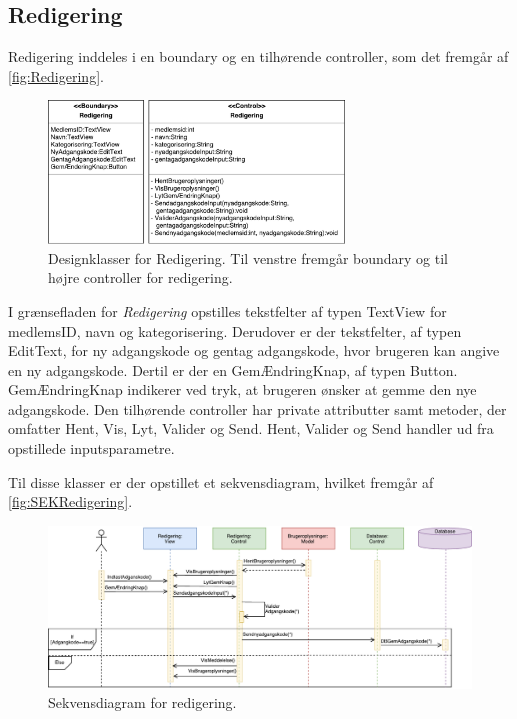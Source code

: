 \subsection*{Redigering}
Redigering inddeles i en boundary og en tilhørende controller, som det fremgår af \autoref{fig:Redigering}. 

\begin{figure} [H]
\centering
\includegraphics[width=0.7\textwidth]{figures/MVC/Redigering}
\caption{Designklasser for Redigering. Til venstre fremgår boundary og til højre controller for redigering.}
\label{fig:Redigering}
\end{figure}

\noindent
I grænsefladen for \textit{Redigering} opstilles tekstfelter af typen TextView for medlemsID, navn og kategorisering. Derudover er der tekstfelter, af typen EditText, for ny adgangskode og gentag adgangskode, hvor brugeren kan angive en ny adgangskode. Dertil er der en GemÆndringKnap, af typen Button. GemÆndringKnap indikerer ved tryk, at brugeren ønsker at gemme den nye adgangskode. 
Den tilhørende controller har private attributter samt metoder, der omfatter Hent, Vis, Lyt, Valider og Send. Hent, Valider og Send handler ud fra opstillede inputsparametre. 


Til disse klasser er der opstillet et sekvensdiagram, hvilket fremgår af \autoref{fig:SEKRedigering}.


\begin{figure} [H]
\centering
\includegraphics[width=1\textwidth]{figures/Sek/SEKRedigering}
\caption{Sekvensdiagram for redigering.}
\label{fig:SEKRedigering}
\end{figure}

